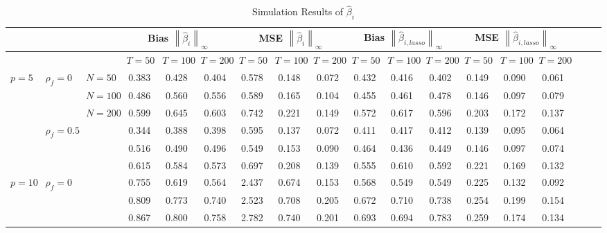 \documentclass[11pt,a4paper]{article}
\theoremstyle{definition}
\newcommand{\norm}[1]{\left\lVert#1\right\rVert}
\begin{document}
\begin{landscape}
\begin{center}
\begin{longtable}{lllccccccccccccccc}
\caption{Simulation Results of $\hat\beta_i$} \label{Table_a} \\
\toprule
 & & & \multicolumn{3}{c}{Bias $\norm{\hat\beta_i}_{\infty}$} & \multicolumn{3}{c}{MSE $\norm{\hat\beta_i}_{\infty}$} & \multicolumn{3}{c}{Bias $\norm{\hat\beta_{i,lasso}}_{\infty}$} & \multicolumn{3}{c}{MSE $\norm{\hat\beta_{i,lasso}}_{\infty}$} \\
\midrule
        &               &         & $T=50$ &  $T=100$ & $T=200$& $T=50$ &  $T=100$ & $T=200$ & $T=50$ & $T=100$ & $T=200$ & $T=50$ & $T=100$ & $T=200$ \\
\cmidrule(lr){4-6}\cmidrule(lr){7-9}\cmidrule(lr){10-12}\cmidrule(lr){13-15}
 $p=5$ &    $\rho_f=0$ &   $N=50$ &  0.383 &  0.428 &  0.404 &    0.578 &    0.148 &  0.072 &  0.432 &  0.416 &  0.402 &  0.149 &  0.090 &  0.061 \\
        &               &  $N=100$ &  0.486 &  0.560 &  0.556 &    0.589 &    0.165 &  0.104 &  0.455 &  0.461 &  0.478 &  0.146 &  0.097 &  0.079 \\
        &               &  $N=200$ &  0.599 &  0.645 &  0.603 &    0.742 &    0.221 &  0.149 &  0.572 &  0.617 &  0.596 &  0.203 &  0.172 &  0.137 \\
\cmidrule(lr){4-6}\cmidrule(lr){7-9}\cmidrule(lr){10-12}\cmidrule(lr){13-15}
        &  $\rho_f=0.5$ &          &  0.344 &  0.388 &  0.398 &    0.595 &    0.137 &  0.072 &  0.411 &  0.417 &  0.412 &  0.139 &  0.095 &  0.064 \\
        &               &          &  0.516 &  0.490 &  0.496 &    0.549 &    0.153 &  0.090 &  0.464 &  0.436 &  0.449 &  0.146 &  0.097 &  0.074 \\
        &               &          &  0.615 &  0.584 &  0.573 &    0.697 &    0.208 &  0.139 &  0.555 &  0.610 &  0.592 &  0.221 &  0.169 &  0.132 \\
\midrule
$p=10$ &    $\rho_f=0$ &          &  0.755 &  0.619 &  0.564 &    2.437 &    0.674 &  0.153 &  0.568 &  0.549 &  0.549 &  0.225 &  0.132 &  0.092 \\
        &               &          &  0.809 &  0.773 &  0.740 &    2.523 &    0.708 &  0.205 &  0.672 &  0.710 &  0.738 &  0.254 &  0.199 &  0.154 \\
        &               &          &  0.867 &  0.800 &  0.758 &    2.782 &    0.740 &  0.201 &  0.693 &  0.694 &  0.783 &  0.259 &  0.174 &  0.134 \\

\end{longtable}
\end{center}
\end{landscape}
\end{document}
